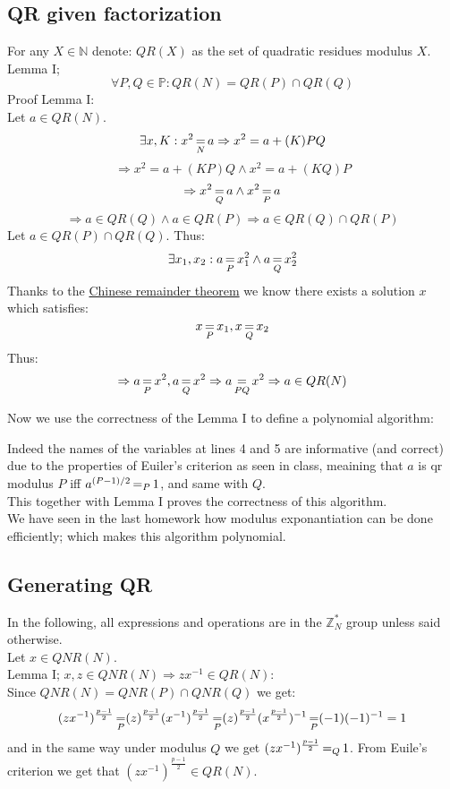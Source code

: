 \subsection{QR given factorization}
For any $X\in\mathbb{N}$ denote: $QR(X)$ as the set of quadratic residues modulus $X$.\\
Lemma I;
\[
	\forall P,Q\in\mathbb{P}:QR(N)=QR(P)\cap QR(Q)
\]
Proof Lemma I:\\
Let $a\in QR(N)$.
\[
	\exists x,K: x^2\operatorname*{=}_N a
	\Rightarrow x^2=a+(K)PQ
\]\[
	\Rightarrow x^2=a+(KP)Q\wedge x^2=a+(KQ)P
\]\[
	\Rightarrow x^2\operatorname*{=}_Qa\wedge x^2\operatorname*{=}_Pa
\]\[
	\Rightarrow a\in QR(Q)\wedge a\in QR(P)
	\Rightarrow a\in QR(Q)\cap QR(P)
\]
Let $a\in QR(P)\cap QR(Q)$.
Thus:
\[
	\exists x_1,x_2: a\operatorname*{=}_Px_1^2\wedge a\operatorname*{=}_Qx_2^2	
\]
Thanks to the
\href{https://en.wikipedia.org/wiki/Chinese_remainder_theorem}
{Chinese remainder theorem}
we know there exists a solution $x$ which satisfies:
\[
	x\operatorname*{=}_Px_1,x\operatorname*{=}_Qx_2
\]
Thus:
\[
	\Rightarrow a\operatorname*{=}_Px^2,a\operatorname*{=}_Qx^2
	\Rightarrow a\operatorname*{=}_{PQ}x^2
	\Rightarrow a\in QR(N)
\]

Now we use the correctness of the Lemma I to define a polynomial algorithm:


Indeed the names of the variables at lines 4 and 5 are informative (and correct) due
to the properties of Euiler's criterion as seen in class, meaining that
$a$ is qr modulus $P$ iff $a^{(P-1)/2}\operatorname*{=}_P1$, and same with $Q$.\\
This together with Lemma I proves the correctness of this algorithm.\\

We have seen in the last homework how modulus exponantiation can be done efficiently;
which makes this algorithm polynomial.

\subsection{Generating QR}
In the following, all expressions and operations are in the $\mathbb{Z}_N^*$ group
unless said otherwise.\\

Let $x\in QNR(N)$.\\
Lemma I; $x,z\in QNR(N)\Rightarrow zx^{-1}\in QR(N)$:\\
Since $QNR(N)=QNR(P)\cap QNR(Q)$ we get:
\[
	(zx^{-1})^{\frac{p-1}{2}}
	\operatorname*{=}_P(z)^{\frac{p-1}{2}}(x^{-1})^{\frac{p-1}{2}}
	\operatorname*{=}_P(z)^{\frac{p-1}{2}}(x^{\frac{p-1}{2}})^{-1}
	\operatorname*{=}_P(-1)(-1)^{-1}=1
\]
and in the same way under modulus $Q$ we get $(zx^{-1})^{\frac{p-1}{2}}\operatorname*{=}_Q1$.
From Euile's criterion we get that $(zx^{-1})^{\frac{p-1}{2}}\in QR(N)$.\\


